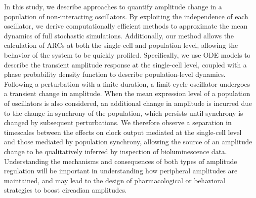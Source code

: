 \documentclass[11pt, letterpaper]{article}
\providecommand{\DIFadd}[1]{{\protect\color{blue}#1}} %
\providecommand{\DIFdel}[1]{{\protect\color{red}}}                      %
\providecommand{\DIFaddbegin}{} %
\providecommand{\DIFaddend}{} %
\providecommand{\DIFdelbegin}{} %
\providecommand{\DIFdelend}{} %
\begin{document}
\DIFaddend In this study, we \DIFdelbegin \DIFdel{provide new tools and definitions }\DIFdelend \DIFaddbegin \DIFadd{describe approaches }\DIFaddend to quantify amplitude change in a population of \DIFdelbegin \DIFdel{oscillators, and determine what factors dominate
amplitude change under certain conditions}\DIFdelend \DIFaddbegin \DIFadd{non-interacting oscillators.
By exploiting the independence of each oscillator, we derive computationally efficient methods to approximate the mean dynamics of full stochastic simulations.
Additionally, our method allows the calculation of ARCs at both the single-cell and population level, allowing the behavior of the system to be quickly profiled}\DIFaddend .
Specifically, we use \DIFdelbegin \DIFdel{ordinary
differential equation (ODE ) limit-cycle models , which describe the behavior of
each individual cell}\DIFdelend \DIFaddbegin \DIFadd{ODE models to describe the transient amplitude response at the single-cell level}\DIFaddend , coupled with \DIFaddbegin \DIFadd{a }\DIFaddend phase probability density \DIFdelbegin \DIFdel{functions to describe the synchrony of the population}\DIFdelend \DIFaddbegin \DIFadd{function to describe population-level dynamics}\DIFaddend .
Following a perturbation with a finite duration, \DIFdelbegin \DIFdel{such as those encountered in entraining to an external signal,
}\DIFdelend a limit cycle oscillator undergoes a transient change in amplitude\DIFdelbegin \DIFdel{as it
returns to the limit cycle with a phase shift. The size of this amplitude
deviation, just as the direction of the phase shift, depends on the initial
phase at which the perturbation is applied. We derive sensitivity-analysis
based methods to efficiently predict such amplitude changes from mathematical
models}\DIFdelend .
When the mean expression level of a population of oscillators is also considered, an additional change in amplitude is incurred due to the change in synchrony of the population\DIFdelbegin \DIFdel{. This effect, which depends on the slope of the
phase response curve at the time of perturbation, persists until the synchrony of the population }\DIFdelend \DIFaddbegin \DIFadd{, which persists until synchrony }\DIFaddend is changed by subsequent perturbations.
\DIFdelbegin \DIFdel{There is therefore }\DIFdelend \DIFaddbegin \DIFadd{We therefore observe }\DIFaddend a separation in timescales between the effects on clock output mediated at the \DIFdelbegin \DIFdel{single cell }\DIFdelend \DIFaddbegin \DIFadd{single-cell }\DIFaddend level and those mediated by population synchrony\DIFdelbegin \DIFdel{. Such a
separation allows }\DIFdelend \DIFaddbegin \DIFadd{, allowing }\DIFaddend the source of an amplitude change to be qualitatively inferred \DIFdelbegin \DIFdel{from the visual }\DIFdelend \DIFaddbegin \DIFadd{by }\DIFaddend inspection of bioluminescence data.
Understanding the mechanisms and consequences of both types \DIFaddbegin \DIFadd{of amplitude regulation }\DIFaddend will be important in understanding how peripheral \DIFdelbegin \DIFdel{clocks are regulated}\DIFdelend \DIFaddbegin \DIFadd{amplitudes are maintained}\DIFaddend , and may lead to the design of pharmacological or behavioral strategies to boost circadian amplitudes.
\end{document}

